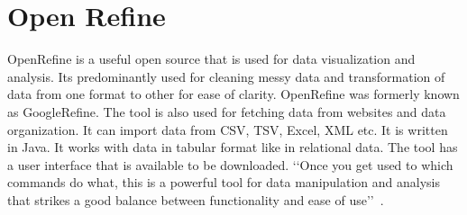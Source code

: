 \section{Open Refine}
OpenRefine is a useful open source that is used for data visualization
and analysis.  Its predominantly used for cleaning messy data and
transformation of data from one format to other for ease of clarity.
OpenRefine was formerly known as GoogleRefine. The tool is also used
for fetching data from websites and data organization. It can import data from 
CSV, TSV, Excel, XML etc. It is written
in Java. It works with data in tabular format like in relational
data. The tool has a user interface that is available to be downloaded. 
‘‘Once you get used to which commands do what, this is a
powerful tool for data manipulation and analysis that strikes a good
balance between functionality and ease of
use’’~\cite{hid-sp18-417-openrefine}.

